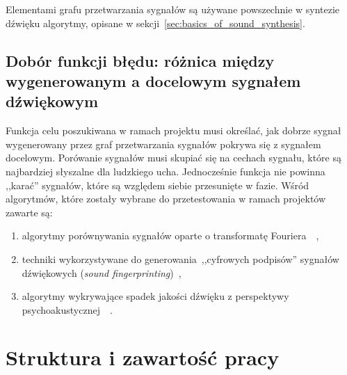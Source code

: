 \noindent
Elementami grafu przetwarzania sygnałów są używane powszechnie w syntezie dźwięku algorytmy,
opisane w sekcji~\ref{sec:basics_of_sound_synthesis}.

\subsection{Dobór funkcji błędu: różnica między wygenerowanym a docelowym sygnałem dźwiękowym}

Funkcja celu poszukiwana w ramach projektu musi określać, jak dobrze sygnał wygenerowany przez
graf przetwarzania sygnałów pokrywa się z sygnałem docelowym. Porówanie sygnałów musi skupiać się
na cechach sygnału, które są najbardziej słyszalne dla ludzkiego ucha. Jednocześnie funkcja nie powinna
,,karać'' sygnałów, które są względem siebie przesunięte w fazie. Wśród algorytmów, które zostały wybrane
do przetestowania w ramach projektów zawarte są:

\begin{enumerate}
  \item algorytmy porównywania sygnałów oparte o transformatę Fouriera~\cite{sliding_fourier}~\cite{mfcc},
  \item techniki wykorzystywane do generowania~,,cyfrowych podpisów'' sygnałów dźwiękowych (\textit{sound fingerprinting})~\cite{computer_vision_music_identification},
  \item algorytmy wykrywające spadek jakości dźwięku z perspektywy psychoakustycznej~\cite{peaq}~\cite{frechet_audio_distance}.
\end{enumerate}

\section{Struktura i zawartość pracy}


